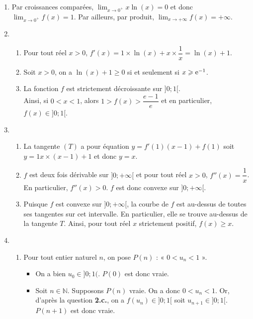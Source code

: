 \documentclass[11pt,fleqn, openany]{book} %
\begin{document}
\begin{solution}\hspace{0pt}
\begin{enumerate}
\item Par croissances comparées, $\displaystyle\lim_{x\to 0^+}x\ln(x)=0$ et donc $\displaystyle\lim_{x \to 0^+}f(x)=1$. Par ailleurs, par produit, $\displaystyle\lim_{x\to +\infty}f(x)=+\infty$.
\item \begin{enumerate}
\item Pour tout réel $x>0$, $f'(x)=1 \times \ln(x)+x \times \dfrac{1}{x}=\ln(x)+1$.
\item Soit $x>0$, on a $\ln(x)+1 \geqslant 0$ si et seulement si $x \geqslant \mathrm{e}^{-1}$.
\begin{center}
\end{center}
\item La fonction $f$ est strictement décroissante sur $]0;1[$. \\ Ainsi, si $0<x<1$, alors $1 > f(x) > \dfrac{e-1}{e}$ et en particulier, $f(x)\in]0;1[$.
\end{enumerate}
\item \begin{enumerate} 
\item La tangente $(T)$ a pour équation $y=f'(1)(x-1)+f(1)$ soit $y=1 x\times (x-1)+1$ et donc $y=x$.
\item $f$ est deux fois dérivable sur $]0;+\infty[$ et pour tout réel $x>0$, $f''(x)=\dfrac{1}{x}$. En particulier, $f''(x)>0$. $f$ est donc convexe sur $]0;+\infty [$.
\item Puisque $f$ est convexe sur $]0;+\infty[$, la courbe de $f$ est au-dessus de toutes ses tangentes sur cet intervalle. En particulier, elle se trouve au-dessus de la tangente $T$. Ainsi, pour tout réel $x$ strictement positif, $f(x)\geqslant x$.\end{enumerate}
\item 
\begin{enumerate}
\item Pour tout entier naturel $n$, on pose $P(n)$ : « $0<u_n<1$ ».
\begin{itemize}
\item On a bien $u_0 \in ]0;1($. $P(0)$ est donc vraie. 
\item Soit $n\in\mathbb{N}$. Supposons $P(n)$ vraie. On a donc $0<u_n<1$. Or, d'après la question \textbf{2.c.}, on a $f(u_n) \in ]0;1[$ soit $u_{n+1} \in ]0;1[$. $P(n+1)$ est donc vraie.

\end{itemize}
\end{enumerate}
\end{enumerate}
\end{solution}
\end{document}
